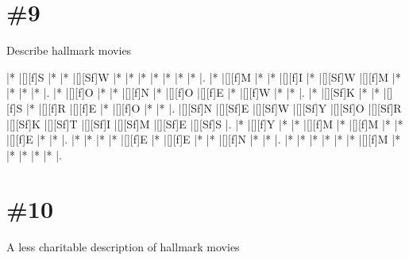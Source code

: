 \documentclass[letterpaper]{article}
\begin{document}
\section*{\#9}
Describe hallmark movies

\vspace*{1em}
\begin{Puzzle}{12}{8}
|*        |[][f]S   |*        |*        |[][Sf]W  |*        |*        |*        |*        |*        |*        |*        |.
|*        |[][f]M   |*        |*        |[][f]I   |*        |[][Sf]W  |[][f]M   |*        |*        |*        |*        |.
|*        |[][f]O   |*        |*        |[][f]N   |*        |[][f]O   |[][f]E   |*        |[][f]W   |*        |*        |.
|*        |[][Sf]K  |*        |*        |[][f]S   |*        |[][f]R   |[][f]E   |*        |[][f]O   |*        |*        |.
|[][Sf]N  |[][Sf]E  |[][Sf]W  |[][Sf]Y  |[][Sf]O  |[][Sf]R  |[][Sf]K  |[][Sf]T  |[][Sf]I  |[][Sf]M  |[][Sf]E  |[][Sf]S  |.
|*        |[][f]Y   |*        |*        |[][f]M   |*        |[][f]M   |*        |*        |[][f]E   |*        |*        |.
|*        |*        |*        |*        |[][f]E   |*        |[][f]E   |*        |*        |[][f]N   |*        |*        |.
|*        |*        |*        |*        |*        |*        |[][f]M   |*        |*        |*        |*        |*        |.
\end{Puzzle}

\section*{\#10}
A less charitable description of hallmark movies
\end{document}
